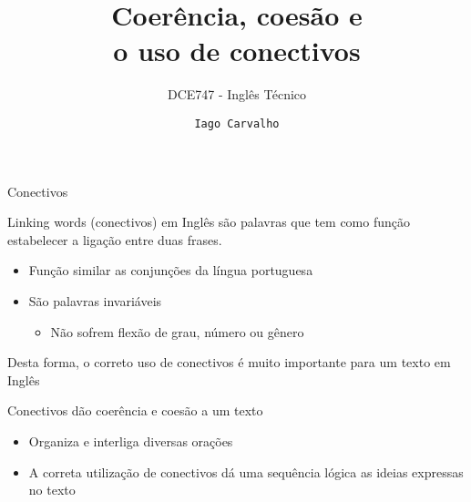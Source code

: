 \documentclass[compress,mathserif,xcolor=table]{beamer}
\title{Coerência, coesão e\\ o uso de conectivos}
\subtitle{DCE747 - Inglês Técnico}
\author{\texttt{Iago Carvalho}}
\institute{\texttt{Departamento de Ciência da Computação}}
\begin{document}
\begin{frame}
\titlepage

\end{frame}


\begin{frame}{Conectivos}

Linking words (conectivos) em Inglês são palavras que tem como função estabelecer a ligação entre duas frases.
\begin{itemize}
    \item Função similar as conjunções da língua portuguesa
    \item São palavras invariáveis
    \begin{itemize}
        \item Não sofrem flexão de grau, número ou gênero
    \end{itemize}
\end{itemize}

\vspace{0.5cm}

Desta forma, o correto uso de conectivos é muito importante para um texto em Inglês

\vspace{0.5cm}

Conectivos dão coerência e coesão a um texto
\begin{itemize}
    \item Organiza e interliga diversas orações
    \item A correta utilização de conectivos dá uma sequência lógica as ideias expressas no texto
\end{itemize}

\end{frame}

\end{document}
